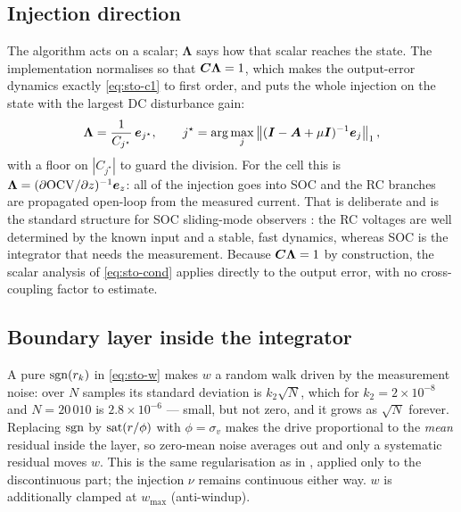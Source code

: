 \subsection{Injection direction}
\label{sec:sto-lambda}
The algorithm acts on a scalar; $\bm{\Lambda}$ says how that scalar reaches the state.  The
implementation normalises so that $\bm{C}\bm{\Lambda} = 1$, which makes the output-error dynamics
exactly \eqref{eq:sto-c1} to first order, and puts the whole injection on the state with the
largest DC disturbance gain:
\begin{equation}
\bm{\Lambda} = \frac{1}{C_{j^\star}}\,\bm{e}_{j^\star} ,
\qquad j^\star = \arg\max_j\left\lVert (\bm{I}-\bm{A}+\mu\bm{I})^{-1}\bm{e}_j \right\rVert_1 ,
\label{eq:sto-lambda}
\end{equation}
with a floor on $|C_{j^\star}|$ to guard the division.  For the cell this is
$\bm{\Lambda} = (\partial\mathrm{OCV}/\partial z)^{-1}\bm{e}_{z}$: all of the injection goes into SOC
and the RC branches are propagated open-loop from the measured current.  That is deliberate and
is the standard structure for SOC sliding-mode observers \cite{kim2006smo}: the RC voltages are
well determined by the known input and a stable, fast dynamics, whereas SOC is the integrator
that needs the measurement.  Because $\bm{C}\bm{\Lambda}=1$ by construction, the scalar analysis of
\eqref{eq:sto-cond} applies directly to the output error, with no cross-coupling factor to
estimate.

\subsection{Boundary layer inside the integrator}
A pure $\operatorname{sgn}(r_k)$ in \eqref{eq:sto-w} makes $w$ a random walk driven by the measurement noise:
over $N$ samples its standard deviation is $k_2\sqrt{N}$, which for $k_2 = 2\times10^{-8}$ and
$N=20\,010$ is $2.8\times10^{-6}$ --- small, but not zero, and it grows as $\sqrt{N}$ forever.
Replacing $\operatorname{sgn}$ by $\operatorname{sat}(r/\phi)$ with $\phi=\sigma_v$ makes the drive proportional to the
\emph{mean} residual inside the layer, so zero-mean noise averages out and only a systematic
residual moves $w$.  This is the same regularisation as in , applied only to the
discontinuous part; the injection $\nu$ remains continuous either way.  $w$ is additionally
clamped at $w_{\max}$ (anti-windup).

